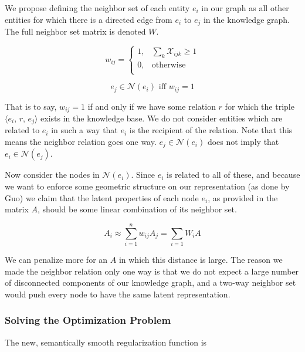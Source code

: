 \documentclass[pageno]{final_paper}
\begin{document}
We propose defining the neighbor set of each entity $e_i$ in our graph as all
other entities for which there is a directed edge from $e_i$ to $e_j$ in the
knowledge graph. The full neighbor set matrix is denoted $W$.

\begin{equation}
    \label{eq: new wij}
    w_{ij} =
    \begin{cases}
        1, & \sum_k \mathcal{X}_{ijk} \geq 1 \\
        0, & \text{otherwise} \\
    \end{cases}
\end{equation}

\begin{equation}
    \label{eq: new neighbor set}
    e_j \in \mathcal{N}(e_i) \text{ iff } w_{ij} = 1
\end{equation}

That is to say, $w_{ij} = 1$ if and only if we have some relation $r$ for which
the triple $\langle e_i,\,r,\,e_j \rangle$ exists in the knowledge base. We do
not consider entities which are related to $e_i$ in such a way that $e_i$ is the
recipient of the relation. Note that this means the neighbor relation goes one
way. $e_j \in \mathcal{N}(e_i)$ does not imply that $e_i \in \mathcal{N}(e_j)$.

Now consider the nodes in $\mathcal{N}(e_i)$. Since $e_i$ is related to all of
these, and because we want to enforce some geometric structure on our
representation (as done by Guo) we claim that the latent properties of each node
$e_i$, as provided in the matrix $A$, should be some linear combination of its
neighbor set.

$$ A_i \approx \sum_{i=1}^n w_{ij}A_j = \sum_{i=1} W_iA$$

We can penalize more for an $A$ in which this distance is large. The reason we
made the neighbor relation only one way is that we do not expect a large number
of disconnected components of our knowledge graph, and a two-way neighbor set
would push every node to have the same latent representation. \\

\subsubsection{Solving the Optimization Problem}
\label{Solving the Optimization Problem}

The new, semantically smooth regularization function is
\end{document}

